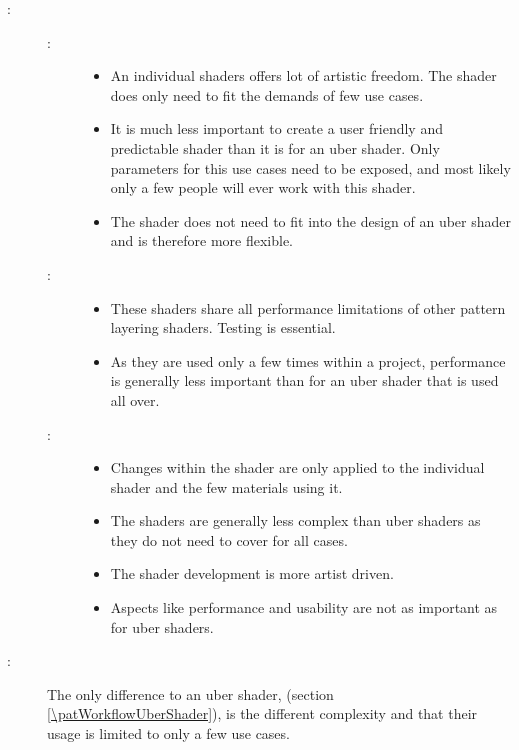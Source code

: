 \begin{description}
	\item[\patConsequences:]\hfill 
		\begin{description}
			\item[\visual:]\hfill
			\begin{itemize}\mynobreakpar
				\item An individual shaders offers lot of artistic freedom. The shader does only need to fit the demands of few use cases. 
				\item It is much less important to create a user friendly and predictable shader than it is for an uber shader. Only parameters for this use cases need to be exposed, and most likely only a few people will ever work with this shader. 
				\item The shader does not need to fit into the design of an uber shader and is therefore more flexible. 
			\end{itemize}
			\item[\performance:]\hfill
			\begin{itemize}\mynobreakpar
				\item These shaders share all performance limitations of other pattern layering shaders. Testing is essential. 
				\item As they are used only a few times within a project, performance is generally less important than for an uber shader that is used all over. 
			\end{itemize}
			\item[\pipeline:]\hfill 
			\begin{itemize}\mynobreakpar
				\item Changes within the shader are only applied to the individual shader and the few materials using it.  
				\item The shaders are generally less complex than uber shaders as they do not need to cover for all cases. 
				\item The shader development is more artist driven.
				\item Aspects like performance and usability are not as important as for uber shaders.
			\end{itemize}
		\end{description}
	\item[\patRelations:]%
	The only difference to an uber shader, \emph{\patWorkflowUberShader} (section \ref{\patWorkflowUberShader}), is the different complexity and that their usage is limited to only a few use cases. 
\end{description}


